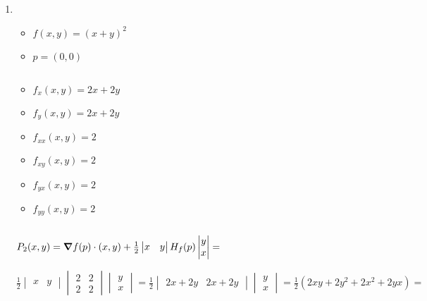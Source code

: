 \documentclass[../practica_05.tex]{subfiles}
\begin{document}
    \begin{enumerate}
        \item 
            \begin{itemize}
                \item $f(x,y) = (x+y)^2$
                \item $p = (0,0)$
            \end{itemize}

            $ $

            \begin{itemize}
                \item $f_{x}(x,y) = 2x + 2y$
                \item $f_{y}(x,y) = 2x + 2y$
                \item $f_{xx}(x,y) = 2 $
                \item $f_{xy}(x,y) = 2 $
                \item $f_{yx}(x,y) = 2 $
                \item $f_{yy}(x,y) = 2 $
            \end{itemize}

            $ $

            $ P_2(x,y) = \grad f(p)\cdot(x,y) + \frac{1}{2} \begin{vmatrix}
                x & y
            \end{vmatrix} H_f(p)  \begin{vmatrix}
                y \\
                x
            \end{vmatrix} = $

            $ \frac{1}{2} \begin{vmatrix}
                x & y
            \end{vmatrix} \begin{vmatrix}
                2   & 2  \\
                2   & 2
            \end{vmatrix} \begin{vmatrix}
                y \\
                x
            \end{vmatrix} = \frac{1}{2} \begin{vmatrix}
                2x + 2y   & 2x + 2y  
            \end{vmatrix} \begin{vmatrix}
                y \\
                x
            \end{vmatrix} = \frac{1}{2}(2xy + 2y^2 + 2x^2 + 2yx) =$
            

\end{enumerate}
\end{document}
